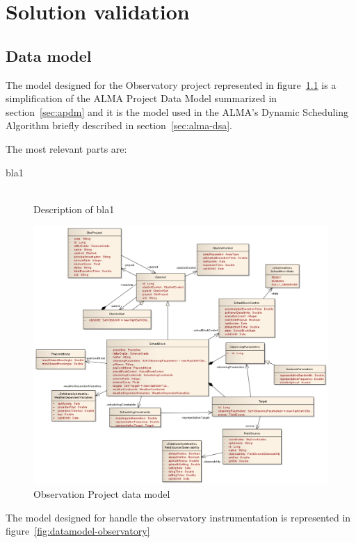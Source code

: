 \chapter{Solution validation}

\section {Data model}

The model designed for the Observatory project represented in figure~\ref{fig:datamodel-obsproject} is a simplification of the ALMA Project Data Model summarized in section~\ref{sec:apdm} and it is the model used in the ALMA's Dynamic Scheduling Algorithm briefly described in section~\ref{sec:alma-dsa}.

The most relevant parts are: 
\begin{description}
\item[bla1] \hfill \\
Description of bla1
\end{description}

\begin{figure}[]	
\begin{center}
\includegraphics[width=1.15\textwidth]{images/ObsProject}
\caption{Observation Project data model}
\end{center}
\label{fig:datamodel-obsproject}
\end{figure}

The model designed for handle the observatory instrumentation is represented in figure~\ref{fig:datamodel-observatory}

